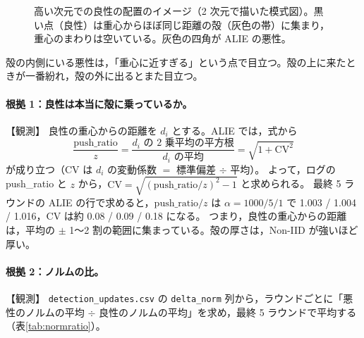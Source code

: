 \documentclass[a4j, dvipdfmx]{jsarticle}  %
\begin{document}
\begin{figure}[H]
\centering
{}
\caption{高い次元での良性の配置のイメージ（2 次元で描いた模式図）。黒い点（良性）は重心からほぼ同じ距離の殻（灰色の帯）に集まり，重心のまわりは空いている。灰色の四角が ALIE の悪性。}
\label{fig:shell}
\end{figure}

殻の内側にいる悪性は，「重心に近すぎる」という点で目立つ。殻の上に来たときが一番紛れ，殻の外に出るとまた目立つ。

\paragraph{根拠 1：良性は本当に殻に乗っているか。}【観測】
良性の重心からの距離を $d_i$ とする。ALIE では，式から
\begin{equation*}
  \frac{\mathrm{push\_ratio}}{z} = \frac{\text{$d_i$ の 2 乗平均の平方根}}{\text{$d_i$ の平均}} = \sqrt{1 + \mathrm{CV}^2}
\end{equation*}
が成り立つ（CV は $d_i$ の変動係数 $=$ 標準偏差 $\div$ 平均）。
よって，ログの push\_ratio と $z$ から，$\mathrm{CV} = \sqrt{(\mathrm{push\_ratio}/z)^2 - 1}$ と求められる。
最終 5 ラウンドの ALIE の行で求めると，$\mathrm{push\_ratio}/z$ は $\alpha = 1000 / 5 / 1$ で 1.003 / 1.004 / 1.016，CV は約 0.08 / 0.09 / 0.18 になる。
つまり，良性の重心からの距離は，平均の $\pm$ 1〜2 割の範囲に集まっている。殻の厚さは，Non-IID が強いほど厚い。

\paragraph{根拠 2：ノルムの比。}【観測】
\texttt{detection\_updates.csv} の \texttt{delta\_norm} 列から，ラウンドごとに「悪性のノルムの平均 $\div$ 良性のノルムの平均」を求め，最終 5 ラウンドで平均する（表\ref{tab:normratio}）。
\end{document}
